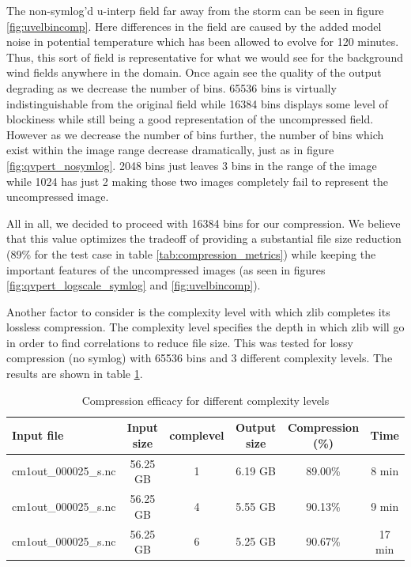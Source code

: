 \documentclass[12pt]{article}
\begin{document}
The non-symlog'd u-interp field far away from the storm can be seen in figure \ref{fig:uvelbincomp}. Here differences in the field are caused by the added model noise in potential temperature which has been allowed to evolve for 120 minutes. Thus, this sort of field is representative for what we would see for the background wind fields anywhere in the domain. Once again see the quality of the output degrading as we decrease the number of bins. 65536 bins is virtually indistinguishable from the original field while 16384 bins displays some level of blockiness while still being a good representation of the uncompressed field. However as we decrease the number of bins further, the number of bins which exist within the image range decrease dramatically, just as in figure \ref{fig:qvpert_nosymlog}. 2048 bins just leaves 3 bins in the range of the image while 1024 has just 2 making those two images completely fail to represent the uncompressed image.

All in all, we decided to proceed with 16384 bins for our compression. We believe that this value optimizes the tradeoff of providing a substantial file size reduction (89\% for the test case in table \ref{tab:compression_metrics}) while keeping the important features of the uncompressed images (as seen in figures \ref{fig:qvpert_logscale_symlog} and \ref{fig:uvelbincomp}).

Another factor to consider is the complexity level with which zlib completes its lossless compression. The complexity level specifies the depth in which zlib will go in order to find correlations to reduce file size. This was tested for lossy compression (no symlog) with 65536 bins and 3 different complexity levels. The results are shown in table \ref{tab:clevtesting}.

\begin{table}[h]
\centering
\begin{tabular}{|l|c|c|c|c|c|}
\hline
\textbf{Input file} & \textbf{Input size} & \textbf{complevel} & \textbf{Output size} & \textbf{Compression (\%)} & \textbf{Time} \\ \hline
cm1out\_000025\_s.nc & 56.25 GB & 1 & 6.19 GB & 89.00\% & 8 min \\ \hline
cm1out\_000025\_s.nc & 56.25 GB & 4 & 5.55 GB & 90.13\% & 9 min \\ \hline
cm1out\_000025\_s.nc & 56.25 GB & 6 & 5.25 GB & 90.67\% & 17 min \\ \hline
\end{tabular}
\caption{Compression efficacy for different complexity levels}
\label{tab:clevtesting}
\end{table}
\end{document}
